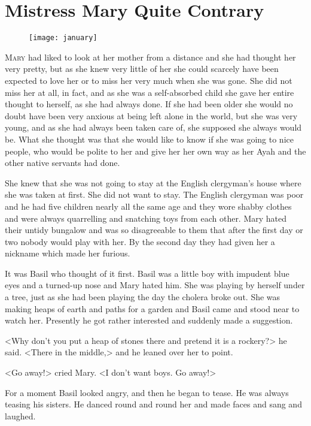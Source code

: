 \chapter{Mistress Mary Quite Contrary} 
	
\begin{figure}[t!]
\centering
\texttt{[image: january]}
\end{figure}

 \lettrine[]{M}{ary} had liked to look at her mother from a distance and she had thought her very pretty, but as she knew very little of her she could scarcely have been expected to love her or to miss her very much when she was gone. She did not miss her at all, in fact, and as she was a self-absorbed child she gave her entire thought to herself, as she had always done. If she had been older she would no doubt have been very anxious at being left alone in the world, but she was very young, and as she had always been taken care of, she supposed she always would be. What she thought was that she would like to know if she was going to nice people, who would be polite to her and give her her own way as her Ayah and the other native servants had done.

She knew that she was not going to stay at the English clergyman's house where she was taken at first. She did not want to stay. The English clergyman was poor and he had five children nearly all the same age and they wore shabby clothes and were always quarrelling and snatching toys from each other. Mary hated their untidy bungalow and was so disagreeable to them that after the first day or two nobody would play with her. By the second day they had given her a nickname which made her furious.

It was Basil who thought of it first. Basil was a little boy with impudent blue eyes and a turned-up nose and Mary hated him. She was playing by herself under a tree, just as she had been playing the day the cholera broke out. She was making heaps of earth and paths for a garden and Basil came and stood near to watch her. Presently he got rather interested and suddenly made a suggestion.

<Why don't you put a heap of stones there and pretend it is a rockery?> he said. <There in the middle,> and he leaned over her to point.

<Go away!> cried Mary. <I don't want boys. Go away!>

For a moment Basil looked angry, and then he began to tease. He was always teasing his sisters. He danced round and round her and made faces and sang and laughed.

